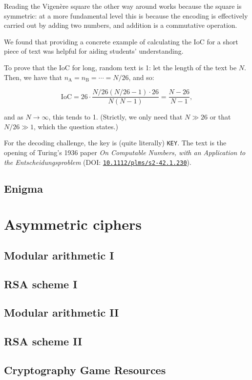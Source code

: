 \documentclass[12pt]{article}
\begin{document}
Reading the Vigen{\`e}re square the other way around works because the square is symmetric: at a more fundamental level this is because the encoding is effectively carried out by adding two numbers, and addition is a commutative operation.

We found that providing a concrete example of calculating the IoC for a short piece of text was helpful for aiding students' understanding.

To prove that the IoC for long, random text is 1: let the length of the text be $N$.
Then, we have that $n_\text{A} = n_\text{B} = \cdots = N/26$, and so:

$$\text{IoC} = 26 \cdot \frac{N/26(N/26 - 1) \cdot 26}{N(N - 1)} = \frac{N - 26}{N - 1},$$

and as $N \to \infty$, this tends to 1. (Strictly, we only need that $N \gg 26$ or that $N / 26 \gg 1$, which the question states.)

For the decoding challenge, the key is (quite literally) \texttt{KEY}.
The text is the opening of Turing's 1936 paper \emph{On Computable Numbers, with an Application to the Entscheidungsproblem} (DOI: \href{https://doi.org/10.1112/plms/s2-42.1.230}{\texttt{10.1112/plms/s2-42.1.230}}).

\subsection{Enigma}

\pagebreak
\section*{Asymmetric ciphers}

\subsection{Modular arithmetic I}

\subsection{RSA scheme I}

\subsection{Modular arithmetic II}

\subsection{RSA scheme II}

\pagebreak

\subsection{Cryptography Game Resources}
\end{document}
